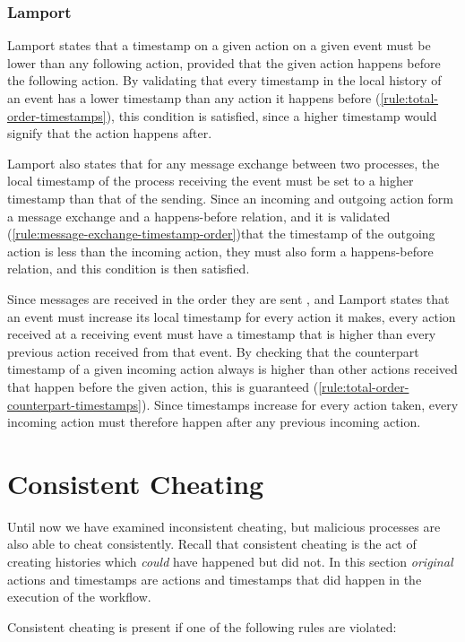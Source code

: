 	\subsubsection{Lamport}
	Lamport states that a timestamp on a given action on a given event must be lower than any following action, provided that the given action happens before the following action. 
	By validating that every timestamp in the local history of an event has a lower timestamp than any action it happens before (\autoref{rule:total-order-timestamps}), this condition is satisfied, since a higher timestamp would signify that the action happens after.
	
	Lamport also states that for any message exchange between two processes, the local timestamp of the process receiving the event must be set to a higher timestamp than that of the sending. 
	Since an incoming and outgoing action form a message exchange and a happens-before relation, and it is validated (\autoref{rule:message-exchange-timestamp-order})that the timestamp of the outgoing action is less than the incoming action, they must also form a happens-before relation, and this condition is then satisfied. 
	
	Since messages are received in the order they are sent , and Lamport states that an event must increase its local timestamp for every action it makes, every action received at a receiving event must have a timestamp that is higher than every previous action received from that event. 
	By checking that the counterpart timestamp of a given incoming action always is higher than other actions received that happen before the given action, this is guaranteed (\autoref{rule:total-order-counterpart-timestamps}). Since timestamps increase for every action taken, every incoming action must therefore happen after any previous incoming action.
	
	\section{Consistent Cheating}
	Until now we have examined inconsistent cheating, but malicious processes are also able to cheat consistently. Recall that consistent cheating is the act of creating histories which \textit{could} have happened but did not. In this section \textit{original} actions and timestamps are actions and timestamps that did happen in the execution of the workflow. 

	\newpar Consistent cheating is present if one of the following rules are violated:

